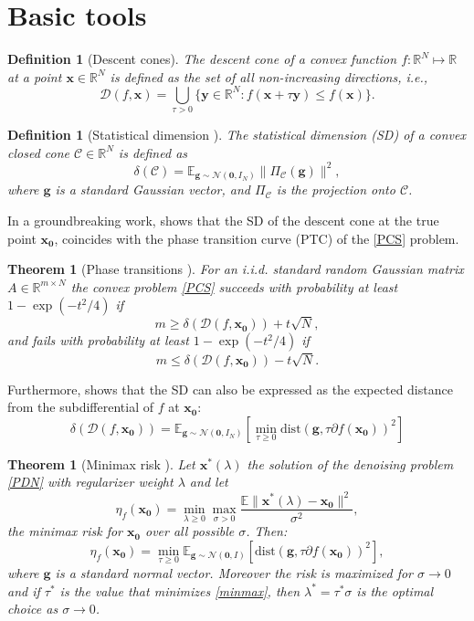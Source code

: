 \documentclass[11pt]{article}
\newcommand{\be}{\begin{equation}}
\newcommand{\ee}{\end{equation}}
\newtheorem{definition}[proposition]{Definition}
\newtheorem{theorem}[proposition]{Theorem}
\begin{document}
\section{Basic tools}

\begin{definition}[Descent cones]
	The descent cone of a convex function $f:\mathbb{R}^N\mapsto \mathbb{R}$ at a point $\bm{x} \in \mathbb{R}^N$ is defined as the set of all non-increasing directions, i.e.,
	\[ \mathcal{D}(f,\bm{x}) = \bigcup_{\tau>0}\{\bm{y}\in\mathbb{R}^N: f(\bm{x}+\tau\bm{y}) \leq f(\bm{x})\}. \]
	\label{DC-def}
\end{definition}
\begin{definition}[Statistical dimension \citep{ALMT14}]
	The statistical dimension (SD) of a convex closed cone $\mathcal{C} \in \mathbb{R}^N$ is defined as 
		\[ \delta(\mathcal{C}) = \mathbb{E}_{\bm{g} \sim \mathcal{N}(\bm{0},I_N)}\|\Pi_{\mathcal{C}}(\bm{g})\|^2, \]
	where $\bm{g}$ is a standard Gaussian vector, and $\Pi_{\mathcal{C}}$ is the projection onto $\mathcal{C}$.
\end{definition}
\noindent In a groundbreaking work, \cite{ALMT14} shows that the SD of the descent cone at the true point $\bm{x_0}$, coincides with the phase transition curve (PTC) of the \ref{PCS} problem.
\begin{theorem}[Phase transitions \citep{ALMT14}]
	For an i.i.d. standard random Gaussian matrix $A \in \mathbb{R}^{m\times N}$ the convex problem \eqref{PCS} succeeds with probability at least $1 - \exp(-t^2/4)$ if 
	\[ m \geq \delta(\mathcal{D}(f,\bm{x_0})) + t\sqrt{N}, \]
	and fails with probability at least $1 - \exp(-t^2/4)$ if
	\[ m \leq \delta(\mathcal{D}(f,\bm{x_0})) - t\sqrt{N}. \]
	\label{PTC-thm}
\end{theorem}
\vskip-0.5cm
\noindent Furthermore, \cite{ALMT14} shows that the SD can also be expressed as the expected distance from the subdifferential of $f$ at $\bm{x_0}$:%
\be
	\delta(\mathcal{D}(f,\bm{x_0})) = \mathbb{E}_{\bm{g} \sim \mathcal{N}(\bm{0},I_N)}[\min_{\tau\geq 0}\mathrm{dist}(\bm{g},\tau\partial f(\bm{x_0}))^2]
	\label{sd_sub}
\ee
\begin{theorem}[Minimax risk \citep{oymak2012relation}]
	Let $\bm{x^*}(\lambda)$ the solution of the denoising problem \eqref{PDN} with regularizer weight $\lambda$ and let %
	\[ \eta_f(\bm{x_0}) = \min_{\lambda\geq 0}\max_{\sigma>0}\dfrac{\mathbb{E}\|\bm{x^*}(\lambda)-\bm{x_0}\|^2}{\sigma^2}, \]
	the minimax risk for $\bm{x_0}$ over all possible $\sigma$. Then: %
	\be \eta_f(\bm{x_0}) = \min_{\tau\geq 0}\mathbb{E}_{\bm{g}\sim\mathcal{N}(\bm{0},I)}[\mathrm{dist}(\bm{g},\tau\partial f(\bm{x_0}))^2], \label{minmax} \ee 
	where $\bm{g}$ is a standard normal vector. Moreover the risk is maximized for $\sigma\rightarrow 0$ and if $\tau^*$ is the value that minimizes \eqref{minmax}, then $\lambda^* = \tau^*\sigma$ is the optimal choice as $\sigma\rightarrow 0$.
	\label{mm_risk}
\end{theorem}
\end{document}
